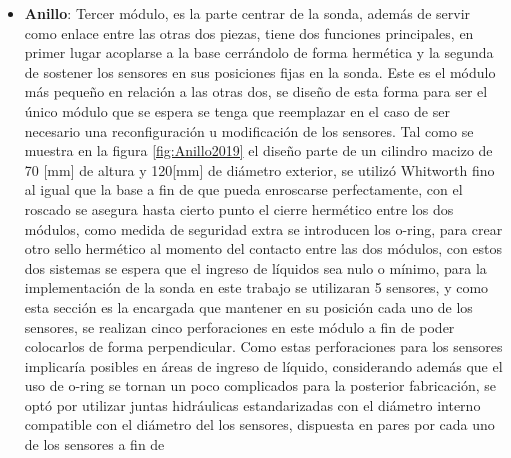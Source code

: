 \begin{itemize}
    \item \textbf{Anillo}: Tercer m\'odulo, es la parte centrar de la sonda, adem\'as de servir como enlace entre las otras dos piezas, tiene dos funciones principales, en primer lugar acoplarse a la base cerr\'andolo de forma herm\'etica y la segunda de sostener los sensores en sus posiciones fijas en la sonda. Este es el m\'odulo m\'as peque\~no en relaci\'on a las otras dos, se dise\~no de esta forma para ser el \'unico m\'odulo que se espera se tenga que reemplazar en el caso de ser necesario una reconfiguraci\'on u modificaci\'on de los sensores. Tal como se muestra en la figura \ref{fig:Anillo2019} el dise\~no parte de un cilindro macizo de 70 [mm] de altura y 120[mm] de di\'ametro exterior, se utiliz\'o Whitworth fino al igual que la base a fin de que pueda enroscarse  perfectamente, con el roscado se asegura hasta cierto punto el cierre herm\'etico entre los dos m\'odulos, como medida de seguridad extra se introducen los o-ring, para crear otro  sello hermético al momento del contacto entre las dos m\'odulos, con estos dos sistemas se espera que el ingreso de l\'iquidos sea nulo o m\'inimo, para la implementaci\'on de la sonda en este trabajo se utilizaran 5 sensores, y como esta secci\'on es la encargada que mantener en su posici\'on cada uno de los sensores, se realizan cinco perforaciones en este m\'odulo a fin de poder colocarlos de forma perpendicular. Como estas perforaciones para los sensores implicar\'ia posibles en \'areas de ingreso de l\'iquido, considerando adem\'as que el uso de o-ring se tornan un poco complicados para la posterior fabricaci\'on, se opt\'o por utilizar juntas hidr\'aulicas estandarizadas con el di\'ametro interno compatible con el di\'ametro del los sensores, dispuesta en pares por cada uno de los sensores a fin de 
    

\end{itemize}

